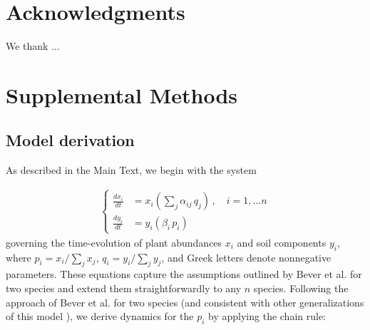 \documentclass[11pt]{article}
\begin{document}
\section*{Acknowledgments}
We thank ...




\section*{Supplemental Methods}

\subsection{Model derivation}

As described in the Main Text, we begin with the system

\begin{align}
\begin{cases}
\frac{dx_i}{dt} &= x_i \left(\sum_{j} \alpha_{ij} \, q_j \right) \, , \quad  i = 1, \dots n \\
\frac{dy_i}{dt} &= y_i \left( \beta_i \, p_i \right)
\end{cases}
\end{align}
governing the time-evolution of plant abundances $x_i$ and soil components $y_i$, where $p_i = x_i / \sum_j x_j$, $q_i = y_i / \sum_j y_j$, and Greek letters denote nonnegative parameters. These equations capture the assumptions outlined by Bever et al. \cite{bever1997incorporating} for two species and extend them straightforwardly to any $n$ species. Following the approach of Bever et al. for two species (and consistent with other generalizations of this model \cite{kulmatiski2008plant,eppinga2018frequency}), we derive dynamics for the $p_i$ by applying the chain rule:
\end{document}
